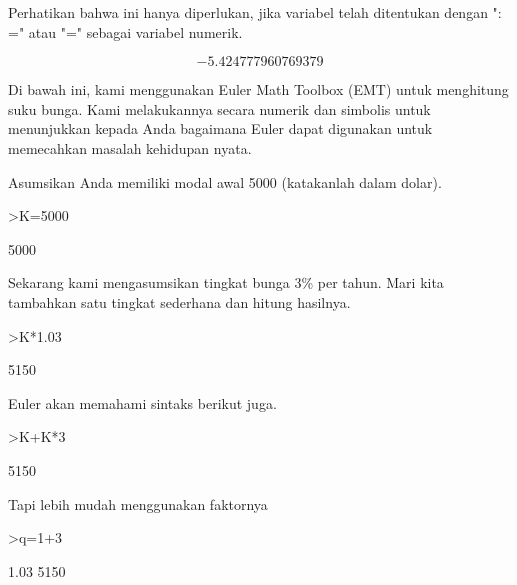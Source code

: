 \documentclass{article}
\begin{document}
\begin{eulernotebook}
\begin{eulercomment}
\begin{eulercomment}
\begin{eulercomment}
\begin{eulercomment}
\begin{eulercomment}
\begin{eulercomment}
\begin{eulercomment}
\begin{eulercomment}
\begin{eulercomment}
Perhatikan bahwa ini hanya diperlukan, jika variabel telah ditentukan
dengan ": =" atau "=" sebagai variabel numerik.
\end{eulercomment}
\begin{eulerformula}
\[
-5.424777960769379
\]
\end{eulerformula}
\begin{eulercomment}
Di bawah ini, kami menggunakan Euler Math Toolbox (EMT) untuk
menghitung suku bunga. Kami melakukannya secara numerik dan simbolis
untuk menunjukkan kepada Anda bagaimana Euler dapat digunakan untuk
memecahkan masalah kehidupan nyata.

Asumsikan Anda memiliki modal awal 5000 (katakanlah dalam dolar).
\end{eulercomment}
\begin{eulerprompt}
>K=5000
\end{eulerprompt}
\begin{euleroutput}
  5000
\end{euleroutput}
\begin{eulercomment}
Sekarang kami mengasumsikan tingkat bunga 3\% per tahun. Mari kita
tambahkan satu tingkat sederhana dan hitung hasilnya.
\end{eulercomment}
\begin{eulerprompt}
>K*1.03
\end{eulerprompt}
\begin{euleroutput}
  5150
\end{euleroutput}
\begin{eulercomment}
Euler akan memahami sintaks berikut juga.
\end{eulercomment}
\begin{eulerprompt}
>K+K*3%
\end{eulerprompt}
\begin{euleroutput}
  5150
\end{euleroutput}
\begin{eulercomment}
Tapi lebih mudah menggunakan faktornya
\end{eulercomment}
\begin{eulerprompt}
>q=1+3%
\end{eulerprompt}
\begin{euleroutput}
  1.03
  5150
\end{euleroutput}
\begin{eulercomment}

\end{eulercomment}
\end{eulercomment}
\end{eulercomment}
\end{eulercomment}
\end{eulercomment}
\end{eulercomment}
\end{eulercomment}
\end{eulercomment}
\end{eulercomment}
\end{eulernotebook}
\end{document}
